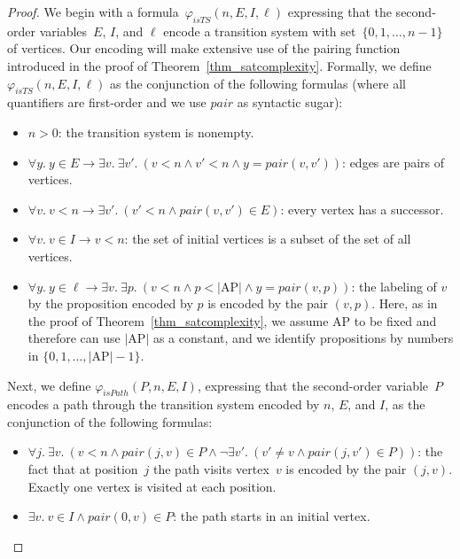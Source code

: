 \documentclass[dvipsnames,10pt,a4paper]{amsart}
\theoremstyle{definition}
\theoremstyle{remark}
\renewcommand{\phi}{\varphi}
\newcommand{\size}[1]{|#1|}
\newcommand{\set}[1]{\{#1\}}
\newcommand{\ap}[0]{\mathrm{AP}}
\newcommand{\pair}{\mathit{pair}}
\newcommand{\ists}{\mathit{isTS}}
\newcommand{\ispath}{\mathit{isPath}}
\begin{document}
\begin{proof}
We begin with a formula~$\phi_\ists(n, E, I, \ell)$ expressing that the second-order variables~$E$, $I$, and $\ell$ encode a transition system with set~$\set{0,1, \ldots, n-1}$ of vertices.
Our encoding will make extensive use of the pairing function introduced in the proof of Theorem~\ref{thm_satcomplexity}.
Formally, we define $\phi_\ists(n, E, I, \ell)$ as the conjunction of the following formulas (where all quantifiers are first-order and we use $\pair$ as syntactic sugar):
\begin{itemize}
    \item $n > 0$: the transition system is nonempty.
    
    \item $\forall y.\ y \in E \rightarrow \exists v.\ \exists v'.\ (v < n \wedge v'<n \wedge y = \pair(v,v'))$: edges are pairs of vertices.

    \item $\forall v.\ v < n \rightarrow \exists v'.\ (v' < n \wedge \pair(v,v') \in E)$: every vertex has a successor.

    \item $\forall v.\ v \in I \rightarrow v < n$: the set of initial vertices is a subset of the set of all vertices.

    \item $\forall y.\ y \in \ell \rightarrow \exists v.\ \exists p.\ (v < n \wedge p < \size{\ap} \wedge y = \pair(v,p))$: the labeling of $v$ by the proposition encoded by $p$ is encoded by the pair $(v,p)$. Here, as in the proof of Theorem~\ref{thm_satcomplexity}, we assume $\ap$ to be fixed and therefore can use $\size{\ap}$ as a constant, and we identify propositions by numbers in $\set{0,1,\ldots, \size{\ap}-1}$.
\end{itemize}

Next, we define $\phi_\ispath(P, n, E, I)$, expressing that the second-order variable~$P$ encodes a path through the transition system encoded by $n$, $E$, and $I$, as the conjunction of the following formulas:
\begin{itemize}
    \item $\forall j.\ \exists v.\ (v < n \wedge \pair(j,v)\in P \wedge \neg \exists v'.\ (v' \neq v \wedge \pair(j,v') \in P))$: the fact that at position~$j$ the path visits vertex~$v$ is encoded by the pair $(j,v)$. Exactly one vertex is visited at each position.

    \item $\exists v.\ v\in I \wedge \pair(0,v) \in P$: the path starts in an initial vertex.


\end{itemize}
\end{proof}
\end{document}
